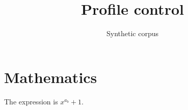 \documentclass{article}
\title{Profile control}
\author{Synthetic corpus}
\date{}
\begin{document}
\maketitle
\section{Mathematics}
The expression is $x^{a_b}+1$.
\end{document}
